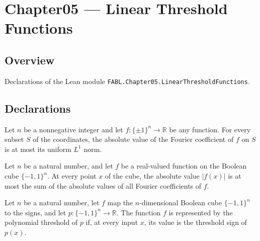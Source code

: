 \chapter{Chapter05 — Linear Threshold Functions}
\section{Overview}

Declarations of the Lean module \texttt{FABL.Chapter05.LinearThresholdFunctions}.

\section{Declarations}

\begin{theorem}
\label{FABL.abs_fourierCoeff_le_uniformLpNorm_one}
\leanok
{}
Let $n$ be a nonnegative integer and let $f\colon\{\pm1\}^n\to\mathbb R$ be any
function. For every subset $S$ of the coordinates, the absolute value of the Fourier
coefficient of $f$ on $S$ is at most its uniform $L^1$ norm.
\end{theorem}

\begin{theorem}
\label{FABL.abs_apply_le_fourierOneNorm}
\leanok
{}
Let $n$ be a natural number, and let $f$ be a real-valued function on the Boolean cube
$\{-1,1\}^n$. At every point $x$ of the cube, the absolute value $|f(x)|$ is at most the
sum of the absolute values of all Fourier coefficients of $f$.
\end{theorem}

\begin{definition}
\label{FABL.IsPolynomialThresholdRepresentation}
\leanok
{}
Let $n$ be a natural number, let $f$ map the $n$-dimensional Boolean cube $\{-1,1\}^n$
to the signs, and let $p:\{-1,1\}^n\to\mathbb R$. The function $f$ is represented by
the polynomial threshold of $p$ if, at every input $x$, its value is the threshold sign
of $p(x)$.
\end{definition}

